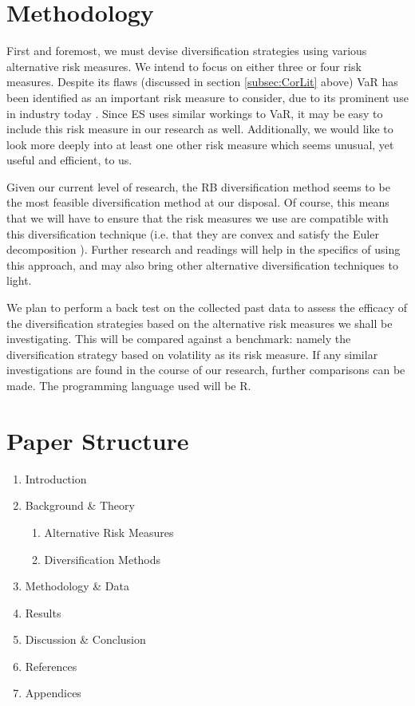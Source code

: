 \documentclass[12pt,a4paper]{article}
\newcommand{\be}{\begin{enumerate}}
\newcommand{\ee}{\end{enumerate}}
\begin{document}
\section{Methodology}
\label{sec:Method}

First and foremost, we must devise diversification strategies using various alternative risk measures. We intend to focus on either three or four risk measures. Despite its flaws (discussed in section \ref{subsec:CorLit} above) VaR has been identified as an important risk measure to consider, due to its prominent use in industry today \citep{consiglirisk}. Since ES uses similar workings to VaR, it may be easy to include this risk measure in our research as well. Additionally, we would like to look more deeply into at least one other risk measure which seems unusual, yet useful and efficient, to us.

Given our current level of research, the RB diversification method seems to be the most feasible diversification method at our disposal. Of course, this means that we will have to ensure that the risk measures we use are compatible with this diversification technique (i.e. that they are convex and satisfy the Euler decomposition \citep{bruder2012managing}). Further research and readings will help in the specifics of using this approach, and may also bring other alternative diversification techniques to light.

We plan to perform a back test on the collected past data to assess the efficacy of the diversification strategies based on the alternative risk measures we shall be investigating. This will be compared against a benchmark: namely the diversification strategy based on volatility as its risk measure. If any similar investigations are found in the course of our research, further comparisons can be made.  The programming language used will be R.

\section{Paper Structure}
\label{sec:struc}

\be
\item Introduction
\item Background \& Theory
	\be
	\item Alternative Risk Measures
	\item Diversification Methods
	\ee
\item Methodology \& Data
\item Results
\item Discussion \& Conclusion
\item References
\item Appendices 
\ee
 
\end{document}
